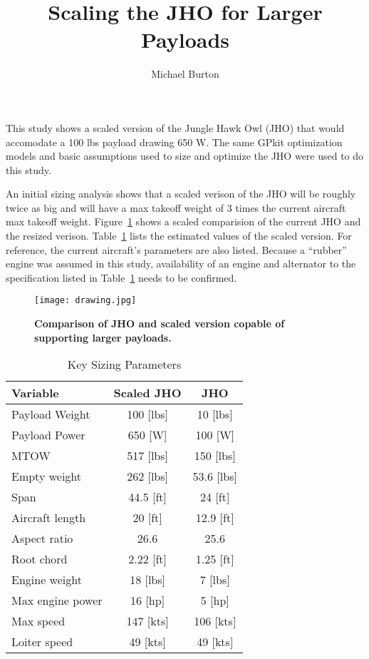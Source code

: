 \documentclass[10pt, a4paper]{article}
\begin{document}
\title{Scaling the JHO for Larger Payloads}
\author{Michael Burton}
\maketitle

This study shows a scaled version of the Jungle Hawk Owl (JHO) that would accomodate a 100 lbs payload drawing 650 W.  
The same GPkit optimization models and basic assumptions used to size and optimize the JHO were used to do this study. 

An initial sizing analysis shows that a scaled verison of the JHO will be roughly twice as big and will have a max takeoff weight of 3 times the current aircraft max takeoff weight.  Figure~\ref{f:drawing} shows a scaled comparision of the current JHO and the resized verison. Table~\ref{t:keyvals} lists the estimated values of the scaled version.  For reference, the current aircraft's parameters are also listed.  Because a ``rubber'' engine was assumed in this study, availability of an engine and alternator to the specification listed in Table~\ref{t:keyvals} needs to be confirmed. 

\begin{figure}[H]
    \begin{center}
        \texttt{[image: drawing.jpg]}
        \caption{\textbf{Comparison of JHO and scaled version copable of supporting larger payloads.}}
        \label{f:drawing}
    \end{center}
\end{figure}

\begin{table}[H]
    \centering
    \begin{tabular}{lcc}
        Variable          & Scaled JHO      & JHO          \\ \hline \hline
        Payload Weight    & 100 [lbs]       & 10 [lbs]     \\
        Payload Power     & 650 [W]         & 100 [W]      \\
        MTOW              & 517 {[}lbs{]}   & 150 [lbs]    \\ 
        Empty weight      & 262 {[}lbs{]}   & 53.6 [lbs]   \\ 
        Span              & 44.5 {[}ft{]}   & 24 [ft]      \\ 
        Aircraft length   & 20 {[}ft{]}     & 12.9 [ft]    \\ 
        Aspect ratio      & 26.6            & 25.6         \\ 
        Root chord        & 2.22 {[}ft{]}   & 1.25 [ft]    \\ 
        Engine weight     & 18 {[}lbs{]}    & 7 [lbs]      \\ 
        Max engine power  & 16 {[}hp{]}     & 5 [hp]       \\ 
        Max speed         & 147 {[}kts{]}   & 106 [kts]    \\ 
        Loiter speed      & 49 {[}kts{]}    & 49 [kts]     \\ 
    \end{tabular}
    \caption{Key Sizing Parameters}
    \label{t:keyvals}
\end{table}
\end{document}
